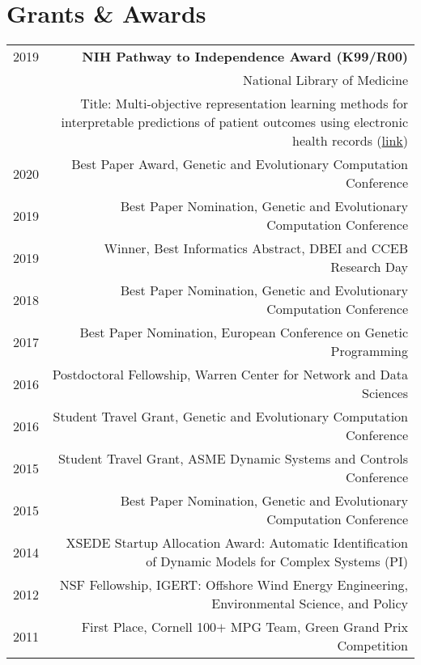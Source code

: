 \section*{Grants \& Awards}
\begin{tabular}{L!{\VRule}R}
    2019& {\bf NIH Pathway to Independence Award (K99/R00) }\\
        & National Library of Medicine\\
        & Title: Multi-objective representation learning methods for interpretable predictions of patient outcomes using electronic health records 
    (\href{https://projectreporter.nih.gov/project_info_description.cfm?aid=9744166&icde=0}{link})\\
2020& Best Paper Award, Genetic and Evolutionary Computation Conference  \\
2019& Best Paper Nomination, Genetic and Evolutionary Computation Conference  \\
2019& Winner, Best Informatics Abstract, DBEI and CCEB Research Day\\
2018& Best Paper Nomination, Genetic and Evolutionary Computation Conference  \\
2017& Best Paper Nomination, European Conference on Genetic Programming  \\
2016& Postdoctoral Fellowship, Warren Center for Network and Data Sciences \\
2016& Student Travel Grant, Genetic and Evolutionary Computation Conference\\
2015& Student Travel Grant, ASME Dynamic Systems and Controls Conference \\
2015& Best Paper Nomination, Genetic and Evolutionary Computation Conference  \\
2014&XSEDE Startup Allocation Award: Automatic Identification of Dynamic Models for Complex Systems (PI) \\
2012& NSF Fellowship, IGERT: Offshore Wind Energy Engineering, Environmental Science, and Policy \\
2011& First Place, Cornell 100$+$ MPG Team, Green Grand Prix Competition \\
\end{tabular}
